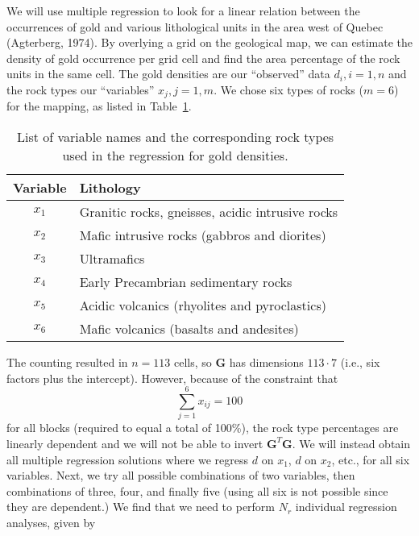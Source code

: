 \begin{example}	
We will use multiple regression to look for a linear relation between the occurrences of gold 
and various lithological units in the area west of Quebec (Agterberg, 1974).  By overlying a grid on the geological 
map, we can estimate the density of gold occurrence per grid cell and find the area percentage of 
the rock units in the same cell.  The gold densities are our ``observed'' data $d_i, i=1,n$ and the rock types 
our ``variables'' $x_j, j = 1,m$.  We chose six types of rocks ($m=6$) for the mapping, as listed in Table~\ref{tbl:rocks}.
\begin{table}[H]
\center
\begin{tabular}{|c|l|} \hline
\bf{Variable} & 	\bf{Lithology} \\ \hline
$x_1$ & 	Granitic rocks, gneisses, acidic intrusive rocks \\ \hline
$x_2$ & 	Mafic intrusive rocks (gabbros and diorites)\\ \hline
$x_3$ &		Ultramafics\\ \hline
$x_4$ & 	Early Precambrian sedimentary rocks\\ \hline
$x_5$ &  	Acidic volcanics (rhyolites and pyroclastics)\\ \hline
$x_6$ & 	Mafic volcanics (basalts and andesites)\\ \hline
\end{tabular}
\caption{List of variable names and the corresponding rock types used in the regression for gold densities.}
\label{tbl:rocks}
\end{table}
The counting resulted in $n = 113$ cells, so $\mathbf{G}$ has dimensions $113 \cdot 7$ (i.e., six factors plus the intercept).  However, 
because of the constraint that
\begin{equation}
\sum^6_{j=1} x_{ij} = 100
\end{equation}	 
for all blocks (required to equal a total of 100\%), the rock type percentages are linearly dependent 
and we will not be able to invert $\mathbf{G}^T\mathbf{G}$.  We will instead obtain all multiple regression 
solutions where we regress $d$ on $x_1$, $d$ on $x_2$, etc., for all six variables.  Next, we try all possible 
combinations of two variables, then combinations of three, four, and finally five (using all six is not possible
since they are dependent.)  We find that we need to perform $N_r$ individual regression analyses, given by

\end{example}
